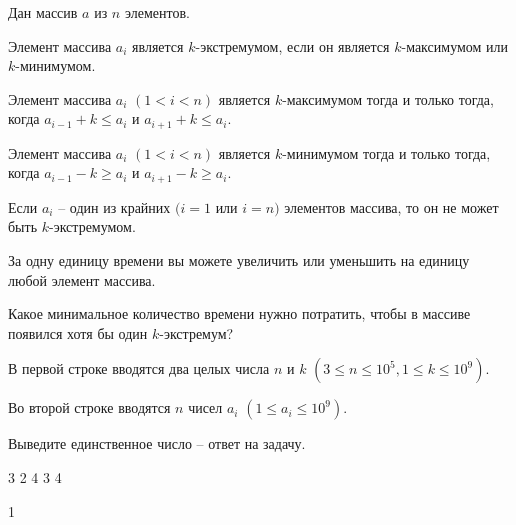 
Дан массив $a$ из $n$ элементов.

Элемент массива $a_i$ является $k$-экстремумом, если он является $k$-максимумом или $k$-минимумом.

Элемент массива $a_i$ $(1 < i < n)$ является $k$-максимумом тогда и только тогда, когда $a_{i - 1} + k \le a_{i}$ и $a_{i + 1} + k \le a_{i}$.

Элемент массива $a_i$ $(1 < i < n)$ является $k$-минимумом тогда и только тогда, когда $a_{i - 1} - k \ge a_{i}$ и $a_{i + 1} - k \ge a_{i}$.

Если $a_i$ -- один из крайних $(i=1$ или $i=n)$ элементов массива, то он не может быть $k$-экстремумом.

За одну единицу времени вы можете увеличить или уменьшить на единицу любой элемент массива.

Какое минимальное количество времени нужно потратить, чтобы в массиве появился хотя бы один $k$-экстремум?


В первой строке вводятся два целых числа $n$ и $k$ $(3 \le n \le 10^{5}, 1 \le k \le 10^{9})$.

Во второй строке вводятся $n$ чисел $a_i$ $(1 \le a_i \le 10^9)$.

\outputfmtSection

Выведите единственное число -- ответ на задачу.

\exampleSection


\begin{myverbbox}[\small]{\vinput}
3 2
4 3 4
\end{myverbbox}
\begin{myverbbox}[\small]{\voutput}
1
\end{myverbbox}

